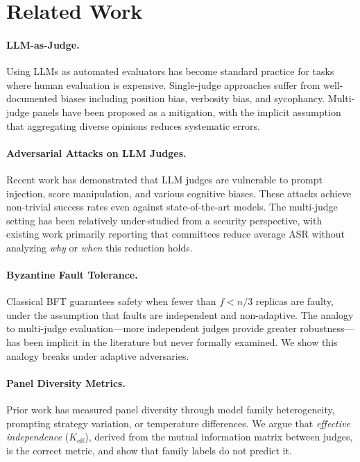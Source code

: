 \documentclass[11pt]{article}
\begin{document}
\section{Related Work}

\paragraph{LLM-as-Judge.}
Using LLMs as automated evaluators has become standard practice for tasks where human evaluation is expensive. Single-judge approaches suffer from well-documented biases including position bias, verbosity bias, and sycophancy. Multi-judge panels have been proposed as a mitigation, with the implicit assumption that aggregating diverse opinions reduces systematic errors.

\paragraph{Adversarial Attacks on LLM Judges.}
Recent work has demonstrated that LLM judges are vulnerable to prompt injection, score manipulation, and various cognitive biases. These attacks achieve non-trivial success rates even against state-of-the-art models. The multi-judge setting has been relatively under-studied from a security perspective, with existing work primarily reporting that committees reduce average ASR without analyzing \emph{why} or \emph{when} this reduction holds.

\paragraph{Byzantine Fault Tolerance.}
Classical BFT guarantees safety when fewer than $f < n/3$ replicas are faulty, under the assumption that faults are independent and non-adaptive. The analogy to multi-judge evaluation---more independent judges provide greater robustness---has been implicit in the literature but never formally examined. We show this analogy breaks under adaptive adversaries.

\paragraph{Panel Diversity Metrics.}
Prior work has measured panel diversity through model family heterogeneity, prompting strategy variation, or temperature differences. We argue that \emph{effective independence} ($K_{\text{eff}}$), derived from the mutual information matrix between judges, is the correct metric, and show that family labels do not predict it.
\end{document}
